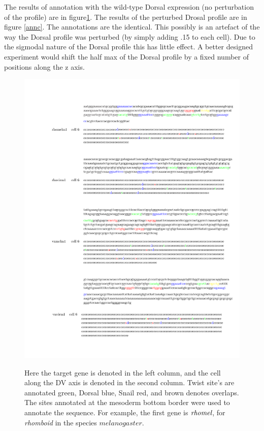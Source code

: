 The results of annotation with the wild-type Dorsal expression (no perturbation of the profile) are in figure\ref{annb}.  The results of the perturbed Drosal profile are in figure \ref{annc}.  The annotations are the identical.  This possibly is an artefact of the way the Dorsal profile was perturbed (by simply adding .15 to each cell).  Due to the sigmodal nature of the Dorsal profile this has little effect.  A better designed experiment would shift the half max of the Dorsal profile by a fixed number of positions along the z axis.


%
\begin{figure}
  \includegraphics[height=1\textwidth]{annb}\\
  \caption{Here the target gene is denoted in the left column, and the cell along the DV axis is denoted in the second column.  Twist site's are annotated green, Dorsal blue, Snail red, and brown denotes overlaps.  The sites annotated at the mesoderm bottom border were used to annotate the sequence.  For example, the first gene is $\emph{rhomel}$, for \textit{rhomboid} in the species $melanogaster$. }\label{annb}
\end{figure}

